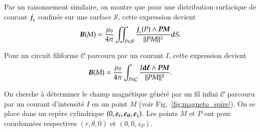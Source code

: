 	Par un raisonnement similaire, on montre que pour une distribution 
	surfacique de courant $\vecj_s$ confinée sur une 
	surface $\mathcal{S}$, cette expression devient
	\begin{equation}
		\vecb(M) = \dfrac{\mu_0}{4 \pi} \iint_{P \in \mathcal{S}} 
		\dfrac{\vecj_s(P) \wedge \mitbf{PM}}{||PM||^3} \mathrm{d}S.
	\end{equation}

	Pour un circuit filiforme $\mathcal{C}$ parcouru par un courant $I$, 
	cette expression devient
	\begin{equation}
		\vecb(M) = \dfrac{\mu_0}{4 \pi} \int_{P \in \mathcal{C}} 
	\dfrac{I \dl \wedge \mitbf{PM}}{||PM||^3}.
	\end{equation}

\begin{exemple}
	On cherche à déterminer le champ magnétique généré par un fil infini $\mathcal{C}$
	parcouru
	par un courant d'intensité $I$ en un point $M$ 
	(voir Fig.~\ref{fig:magneto_spire}). On se place dans un repère cylindrique
	$(0, \er, \etheta, \ez)$. Les points $M$ et $P$ ont pour coordonnées 
	respectives $(r, \theta, 0)$ et $(0, 0, z_P)$.


\end{exemple}
